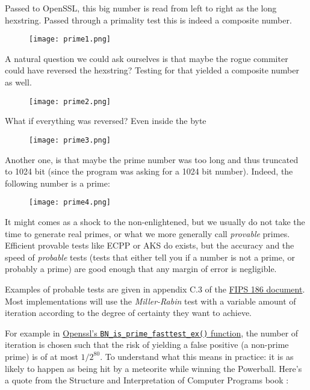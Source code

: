 \documentclass[a4paper,11pt]{article}
\begin{document}
Passed to OpenSSL, this big number is read from left to right as the long hexstring. Passed through a primality test this is indeed a composite number.

\begin{figure}[H]
\centering
\texttt{[image: prime1.png]}
\end{figure}

A natural question we could ask ourselves is that maybe the rogue commiter could have reversed the hexstring? Testing for that yielded a composite number as well.

\begin{figure}[H]
\centering
\texttt{[image: prime2.png]}
\end{figure}

What if everything was reversed? Even inside the byte

\begin{figure}[H]
\centering
\texttt{[image: prime3.png]}
\end{figure}

Another one, is that maybe the prime number was too long and thus truncated to 1024 bit (since the program was asking for a 1024 bit number). Indeed, the following number is a prime:

\begin{figure}[H]
\centering
\texttt{[image: prime4.png]}
\end{figure}

It might comes as a shock to the non-enlightened, but we usually do not take the time to generate real primes, or what we more generally call \emph{provable} primes. Efficient provable tests like ECPP or AKS \cite{ecpp} do exists, but the accuracy and the speed of \emph{probable} tests (tests that either tell you if a number is not a prime, or probably a prime) are good enough that any margin of error is negligible.

Examples of probable tests are given in appendix C.3 of the  \href{http://csrc.nist.gov/publications/fips/fips186-3/fips_186-3.pdf}{FIPS 186 document}. Most implementations will use the \emph{Miller-Rabin} test with a variable amount of iteration according to the degree of certainty they want to achieve.

For example in \href{https://www.openssl.org/docs/manmaster/crypto/BN_generate_prime.html}{Openssl's \texttt{BN_is_prime_fasttest_ex()} function}, the number of iteration is chosen such that the risk of yielding a false positive (a non-prime prime) is of at most $1/2^{80}$. To understand what this means in practice: it is as likely to happen as being hit by a meteorite while winning the Powerball. Here's a quote from the Structure and Interpretation of Computer Programs book \cite{sicp}:
\end{document}
